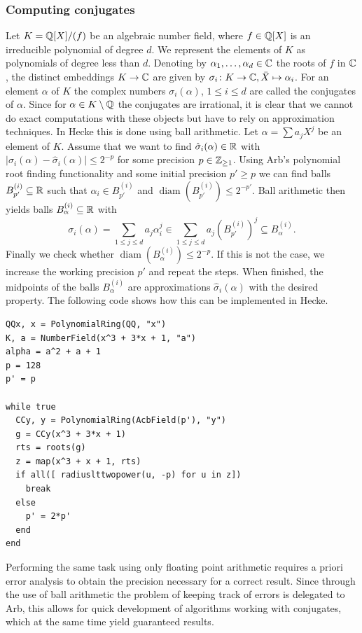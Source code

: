 \documentclass{sig-alternate-05-2015}
\begin{document}
\subsubsection{Computing conjugates}\label{subsub:conj}

Let $K = \mathbb{Q}[X]/(f)$ be an algebraic number field, where $f \in \mathbb{Q}[X]$ is an irreducible polynomial of degree $d$.
We represent the elements of $K$ as polynomials of degree less than $d$.
Denoting by $\alpha_1,\dotsc,\alpha_d \in \mathbb{C}$ the roots of $f$ in $\mathbb{C}$, the distinct embeddings $K \to \mathbb{C}$ are given by $\sigma_i \colon K \to \mathbb{C}, \bar X \mapsto \alpha_i$. For an element $\alpha$ of $K$ the complex numbers $\sigma_i(\alpha)$, $1 \leq i \leq d$ are called the conjugates of $\alpha$.
Since for $\alpha \in K \setminus \mathbb{Q}$ the conjugates are irrational, it is clear that we cannot do exact computations with these objects but have to rely on approximation techniques.
In Hecke this is done using ball arithmetic. Let $\alpha = \sum a_j X^j$ be an element of $K$. 
Assume that we want to find $\hat \sigma_i(\alpha) \in \mathbb{R}$ with $\lvert \sigma_i(\alpha) - \hat \sigma_i(\alpha) \rvert \leq 2^{-p}$ for some precision $p \in \mathbb{Z}_{\geq 1}$.
Using Arb's polynomial root finding functionality and some initial precision $p' \geq p$ we can find balls $B_{p'}^{(i)} \subseteq \mathbb{R}$ such that $\alpha_i \in B_{p'}^{(i)}$ and $\operatorname{diam}(B_{p'}^{(i)}) \leq 2^{-p'}$.
Ball arithmetic then yields balls $B_\alpha^{(i)} \subseteq \mathbb{R}$ with
\[ \sigma_i(\alpha) = \sum_{1 \leq j \leq d} a_j \alpha_i^j \in \sum_{1 \leq j \leq d} a_j (B_{p'}^{(i)})^j\subseteq B_\alpha^{(i)}. \]
Finally we check whether $\operatorname{diam}(B_\alpha^{(i)}) \leq 2^{-p}$. If this is not the case, we increase the working precision $p'$ and repeat the steps.
When finished, the midpoints of the balls $B_\alpha^{(i)}$ are approximations $\hat \sigma_i(\alpha)$ with the desired property.
The following code shows how this can be implemented in Hecke.

\begin{verbatim}
QQx, x = PolynomialRing(QQ, "x")
K, a = NumberField(x^3 + 3*x + 1, "a")
alpha = a^2 + a + 1
p = 128
p' = p

while true
  CCy, y = PolynomialRing(AcbField(p'), "y")
  g = CCy(x^3 + 3*x + 1)
  rts = roots(g)
  z = map(x^3 + x + 1, rts)
  if all([ radiuslttwopower(u, -p) for u in z])
    break
  else
    p' = 2*p'
  end
end
\end{verbatim}

Performing the same task using only floating point arithmetic requires a priori error analysis to obtain the precision necessary for a correct result.
Since through the use of ball arithmetic the problem of keeping track of errors is delegated to Arb, this allows for quick development of algorithms working with conjugates, which at the same time yield guaranteed results.
\end{document}
